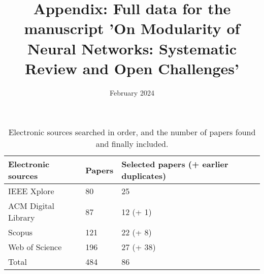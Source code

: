 \documentclass{article}
\title{Appendix: Full data for the manuscript 'On  Modularity of Neural Networks:  Systematic  Review and Open Challenges'}
\date{February 2024}
\begin{document}
\maketitle

                                                                                    



\begin{table}[h]
\centering
\caption{Electronic sources searched in order, and the number of papers found and finally included.} \label{tab:sources}
\begin{tabularx}{\columnwidth}{p{4cm} p{1.5cm} X}
\hline
Electronic sources & Papers & Selected papers  (+ earlier duplicates)\\ 
\hline
IEEE Xplore  & 80 & 25  \\
ACM Digital Library & 87 & 12 (+ 1) \\
Scopus  & 121 & 22 (+ 8)  \\
Web of Science & 196 & 27 (+ 38) \\

\hline
Total & 484 & 86 \\ \hline
\end{tabularx}
\end{table}
\end{document}
